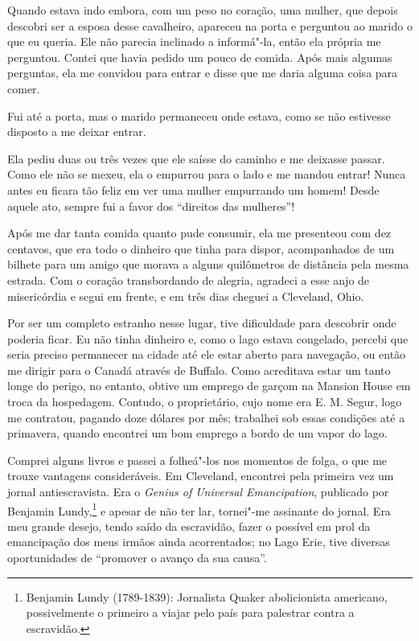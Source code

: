 Quando estava indo embora, com um peso no coração, uma mulher, que
depois descobri ser a esposa desse cavalheiro, apareceu na porta e
perguntou ao marido o que eu queria. Ele não parecia inclinado a
informá"-la, então ela própria me perguntou. Contei que havia pedido um
pouco de comida. Após mais algumas perguntas, ela me convidou para
entrar e disse que me daria alguma coisa para comer.

Fui até a porta, mas o marido permaneceu onde estava, como se não
estivesse disposto a me deixar entrar.

Ela pediu duas ou três vezes que ele saísse do caminho e me deixasse
passar. Como ele não se mexeu, ela o empurrou para o lado e me mandou
entrar! Nunca antes eu ficara tão feliz em ver uma mulher empurrando um
homem! Desde aquele ato, sempre fui a favor dos ``direitos das
mulheres''!

Após me dar tanta comida quanto pude consumir, ela me presenteou com dez
centavos, que era todo o dinheiro que tinha para dispor, acompanhados de
um bilhete para um amigo que morava a alguns quilômetros de distância
pela mesma estrada. Com o coração transbordando de alegria, agradeci a
esse anjo de misericórdia e segui em frente, e em três dias cheguei a
Cleveland, Ohio.

Por ser um completo estranho nesse lugar, tive dificuldade para
descobrir onde poderia ficar. Eu não tinha dinheiro e, como o lago
estava congelado, percebi que seria preciso permanecer na cidade até ele
estar aberto para navegação, ou então me dirigir para o Canadá através
de Buffalo. Como acreditava estar um tanto longe do perigo, no entanto,
obtive um emprego de garçom na Mansion House em troca da hospedagem.
Contudo, o proprietário, cujo nome era E. M. Segur, logo me contratou,
pagando doze dólares por mês; trabalhei sob essas condições até a
primavera, quando encontrei um bom emprego a bordo de um vapor do lago.

Comprei alguns livros e passei a folheá"-los nos momentos de folga, o que
me trouxe vantagens consideráveis. Em Cleveland, encontrei pela primeira
vez um jornal antiescravista. Era o \emph{Genius of Universal
Emancipation}, publicado por Benjamin Lundy,\footnote{Benjamin Lundy
  (1789-1839): Jornalista Quaker abolicionista americano, possivelmente
  o primeiro a viajar pelo país para palestrar contra a escravidão.} e
apesar de não ter lar, tornei"-me assinante do jornal. Era meu grande
desejo, tendo saído da escravidão, fazer o possível em prol da
emancipação dos meus irmãos ainda acorrentados; no Lago Erie, tive
diversas oportunidades de ``promover o avanço da sua causa''.

